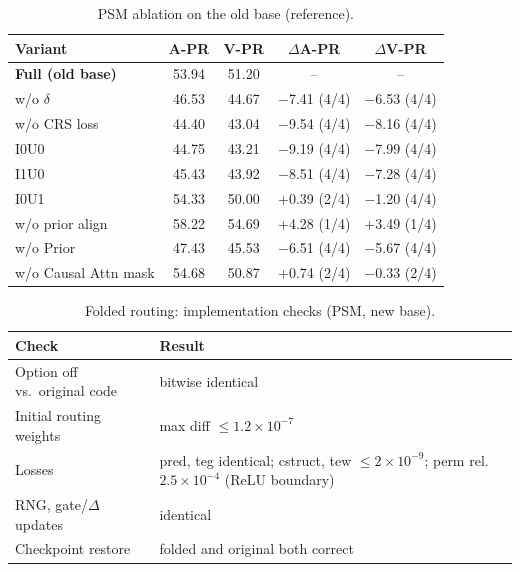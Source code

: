 \documentclass[10pt]{article}
\newcommand{\B}[1]{\textbf{#1}}
\newcommand{\m}{$-$}
\begin{document}
\begin{table}[h]
\centering
\caption{PSM ablation on the old base (reference).}
\label{tab:abl_old}
\begin{tabular}{lcccc}
\toprule
Variant & A-PR & V-PR & $\Delta$A-PR & $\Delta$V-PR \\
\midrule
\B{Full (old base)}       & 53.94 & 51.20 & -- & -- \\
w/o $\delta$              & 46.53 & 44.67 & \m7.41 (4/4) & \m6.53 (4/4) \\
w/o CRS loss              & 44.40 & 43.04 & \m9.54 (4/4) & \m8.16 (4/4) \\
I0U0                      & 44.75 & 43.21 & \m9.19 (4/4) & \m7.99 (4/4) \\
I1U0                      & 45.43 & 43.92 & \m8.51 (4/4) & \m7.28 (4/4) \\
I0U1                      & 54.33 & 50.00 & +0.39 (2/4) & \m1.20 (4/4) \\
w/o prior align           & 58.22 & 54.69 & +4.28 (1/4) & +3.49 (1/4) \\
w/o Prior                 & 47.43 & 45.53 & \m6.51 (4/4) & \m5.67 (4/4) \\
w/o Causal Attn mask      & 54.68 & 50.87 & +0.74 (2/4) & \m0.33 (2/4) \\
\bottomrule
\end{tabular}
\end{table}

\begin{table}[h]
\centering
\caption{Folded routing: implementation checks (PSM, new base).}
\label{tab:fold_check}
\begin{tabular}{lp{10cm}}
\toprule
Check & Result \\
\midrule
Option off vs.\ original code & bitwise identical \\
Initial routing weights & max diff $\le 1.2\times10^{-7}$ \\
Losses & pred, teg identical; cstruct, tew $\le 2\times10^{-9}$; perm rel.\ $2.5\times10^{-4}$ (ReLU boundary) \\
RNG, gate/$\Delta$ updates & identical \\
Checkpoint restore & folded and original both correct \\
\bottomrule
\end{tabular}
\end{table}
\end{document}

